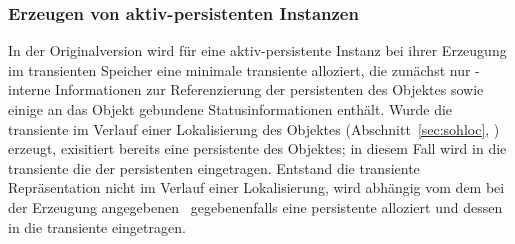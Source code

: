 \subsubsection{Erzeugen von aktiv-persistenten Instanzen}
%
In der Originalversion wird f\"{u}r eine aktiv-persistente Instanz bei
ihrer Erzeugung im transienten Speicher eine minimale transiente
\representation{} alloziert, die zun\"{a}chst nur \soh-interne
Informationen zur Referenzierung der persistenten \representation{} des
Objektes sowie einige an das Objekt gebundene Statusinformationen
enth\"{a}lt.  Wurde die transiente \representation{} im Verlauf einer
Lokalisierung des Objektes (Abschnitt~\ref{sec:sohloc},
\citepage{\pageref{sec:sohloc}}) erzeugt, exisitiert bereits eine
persistente \representation{} des Objektes; in diesem Fall wird
in die transiente \representation{} die \objid\/ der persistenten
\representation{} eingetragen. Entstand die transiente Repr\"{a}sentation
nicht im Verlauf einer Lokalisierung, wird abh\"{a}ngig vom dem bei der
Erzeugung angegebenen
\ gegebenenfalls eine
persistente \representation{} alloziert und dessen \objid\/ in die
transiente \representation{} eingetragen.
%
